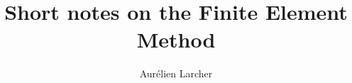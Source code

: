 \documentclass[a4paper]{tmanotes}
\begin{document}
\title{Short notes on the Finite Element Method}
\author{Aurélien Larcher}

\date{}

\maketitle

\newpage

\tableofcontents


\newpage


\newpage
\makenomenclature
\printnomenclature

\newpage


\newpage


\newpage
%

\newpage
%

\newpage
%

\newpage
%

\newpage
%

\newpage
%
\end{document}
